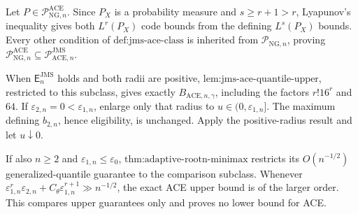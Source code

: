 Let \(P\in\mathcal P_{\mathrm{NG},n}^{\mathrm{ACE}}\).  Since \(P_X\) is a probability measure and \(s\ge r+1>r\), Lyapunov's inequality gives both \(L^r(P_X)\) code bounds from the defining \(L^s(P_X)\) bounds.  Every other condition of \(\text{def:jms-ace-class}\) is inherited from \(\mathcal P_{\mathrm{NG},n}\), proving \(\mathcal P_{\mathrm{NG},n}^{\mathrm{ACE}}\subseteq\mathcal P_{\mathrm{ACE},n}^{\mathrm{JMS}}\).

When \(\mathsf E_n^{\mathrm{JMS}}\) holds and both radii are positive, \(\text{lem:jms-ace-quantile-upper}\), restricted to this subclass, gives exactly \(B_{\mathrm{ACE},n,\gamma}\), including the factors \(r!16^r\) and \(64\).  If \(\varepsilon_{2,n}=0<\varepsilon_{1,n}\), enlarge only that radius to \(u\in(0,\varepsilon_{1,n}]\).  The maximum defining \(b_{2,n}\), hence eligibility, is unchanged.  Apply the positive-radius result and let \(u\downarrow0\).

If also \(n\ge2\) and \(\varepsilon_{1,n}\le\varepsilon_0\), \(\text{thm:adaptive-rootn-minimax}\) restricts its \(O(n^{-1/2})\) generalized-quantile guarantee to the comparison subclass.  Whenever \(\varepsilon_{1,n}^r\varepsilon_{2,n}+C_\theta\varepsilon_{1,n}^{r+1}\gg n^{-1/2}\), the exact ACE upper bound is of the larger order.  This compares upper guarantees only and proves no lower bound for ACE.